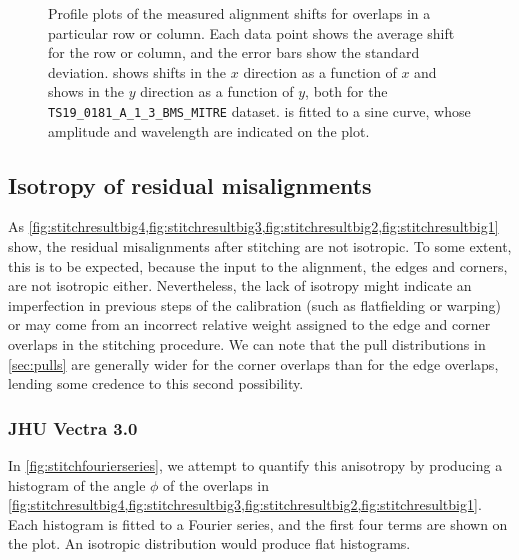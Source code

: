 \documentclass{article}
\begin{document}
\begin{figure}[ht]
\begin{subfigure}{0.49\linewidth}
		\caption{}
		\label{fig:sinewaveyyAKY}
	\end{subfigure}
	\caption{Profile plots of the measured alignment shifts for overlaps in a particular row or column.  Each data point shows the average shift for the row or column, and the error bars show the standard deviation.   shows shifts in the $x$ direction as a function of $x$ and  shows in the $y$ direction as a function of $y$, both for the \texttt{TS19\_0181\_A\_1\_3\_BMS\_MITRE} dataset.   is fitted to a sine curve, whose amplitude and wavelength are indicated on the plot.}
	\label{fig:sinewavesAKY}
\end{figure}

\clearpage

\subsection{Isotropy of residual misalignments}

As \cref{fig:stitchresultbig4,fig:stitchresultbig3,fig:stitchresultbig2,fig:stitchresultbig1} show, the residual misalignments after stitching are not isotropic.  To some extent, this is to be expected, because the input to the alignment, the edges and corners, are not isotropic either.  Nevertheless, the lack of isotropy might indicate an imperfection in previous steps of the calibration (such as flatfielding or warping) or may come from an incorrect relative weight assigned to the edge and corner overlaps in the stitching procedure.  We can note that the pull distributions in \cref{sec:pulls} are generally wider for the corner overlaps than for the edge overlaps, lending some credence to this second possibility.

\subsubsection{JHU Vectra 3.0}

In \cref{fig:stitchfourierseries}, we attempt to quantify this anisotropy by producing a histogram of the angle $\phi$ of the overlaps in \cref{fig:stitchresultbig4,fig:stitchresultbig3,fig:stitchresultbig2,fig:stitchresultbig1}.  Each histogram is fitted to a Fourier series, and the first four terms are shown on the plot.  An isotropic distribution would produce flat histograms.
\end{document}
